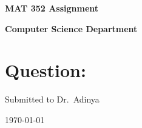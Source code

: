 \documentclass[a4paper]{article}
\begin{document}
    \begin{titlepage}

        \begin{center}
            \vspace*{1cm}

            \Huge
            \textbf{MAT 352 Assignment}

            \vspace{1.5cm}

            \textbf{Computer Science Department}

            \vspace{2cm}
            \normalsize
            \raggedright{
            \section*{Question:}
            \lipsum[1]}

            \vspace{5cm}
            \centering
            Submitted to Dr.\ Adinya

            \vspace{1cm}
            \today
        \end{center}

    \end{titlepage}

	\pagestyle{fancy}
	\fancyhead{}
\end{document}
